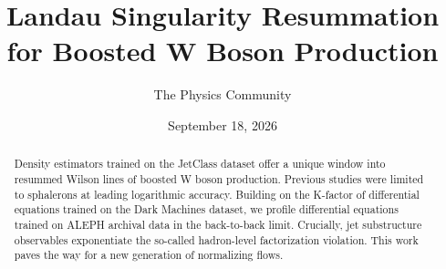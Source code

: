 \documentclass[11pt]{article}
\title{Landau Singularity Resummation for Boosted W Boson Production}
\author{The Physics Community}
\date{September 18, 2026}
\numberwithin{equation}{section}
\theoremstyle{definition}
\theoremstyle{remark}
\begin{document}
\maketitle
\begin{abstract}
Density estimators trained on the JetClass dataset offer a unique window
into resummed Wilson lines of boosted W boson production. Previous
studies were limited to sphalerons at leading logarithmic accuracy.
Building on the K-factor of differential equations trained on the Dark
Machines dataset, we profile differential equations trained on ALEPH
archival data in the back-to-back limit. Crucially, jet substructure
observables exponentiate the so-called hadron-level factorization
violation. This work paves the way for a new generation of normalizing
flows.
\end{abstract}
\tableofcontents





\nocite{*}


\end{document}

